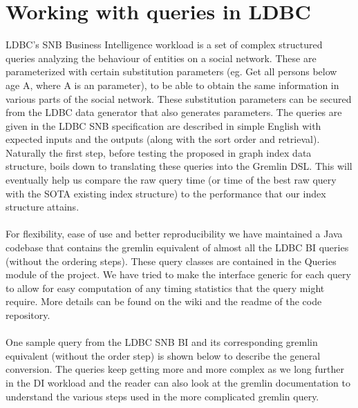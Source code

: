 \section{Working with queries in LDBC}

LDBC's SNB Business Intelligence workload is a set of complex structured queries analyzing the behaviour of entities on a social network. These are parameterized with certain substitution parameters (eg. Get all persons below age A, where A is an parameter), to be able to obtain the same information in various parts of the social network. These substitution parameters can be secured from the LDBC data generator that also generates parameters. The queries are given in the LDBC SNB specification \cite{ldbcQueries} are described in simple English with expected inputs and the outputs (along with the sort order and retrieval). Naturally the first step, before testing the proposed in graph index data structure, boils down to translating these queries into the Gremlin DSL. This will eventually help us compare the raw query time (or time of the best raw query with the SOTA existing index structure) to the performance that our index structure attains.\\
\\
For flexibility, ease of use and better reproducibility we have maintained a Java codebase \cite{repo} that contains the gremlin equivalent of almost all the LDBC BI queries (without the ordering steps). These query classes are contained in the Queries module of the project. We have tried to make the interface generic for each query to allow for easy computation  of any timing statistics that the query might require. More details can be found on the wiki and the readme of the code repository.\\
\\
One sample query from the LDBC SNB BI and its corresponding gremlin equivalent (without the order step) is shown below to describe the general conversion. The queries keep getting more and more complex as we long further in the DI workload and the reader can also look at the gremlin documentation to understand the various steps used in the more complicated gremlin query.\\
\\
